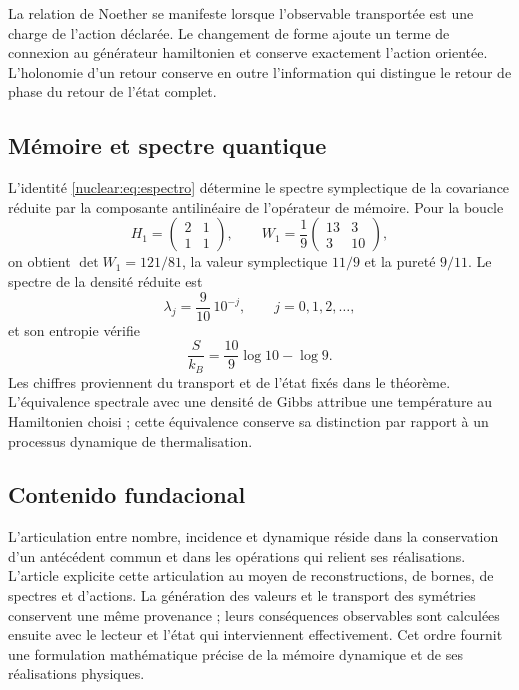 La relation de Noether se manifeste lorsque l’observable transportée est une charge de l’action déclarée. Le changement de forme ajoute un terme de connexion au générateur hamiltonien et conserve exactement l’action orientée. L’holonomie d’un retour conserve en outre l’information qui distingue le retour de phase du retour de l’état complet.


\subsection{Mémoire et spectre quantique}
L’identité \eqref{nuclear:eq:espectro} détermine le spectre symplectique de la covariance réduite par la composante antilinéaire de l’opérateur de mémoire. Pour la boucle
\[
H_1=\begin{pmatrix}2&1\\1&1\end{pmatrix},
\qquad
W_1=\frac19\begin{pmatrix}13&3\\3&10\end{pmatrix},
\]
on obtient \(\det W_1=121/81\), la valeur symplectique \(11/9\) et la pureté \(9/11\). Le spectre de la densité réduite est
\[
\lambda_j=\frac9{10}\,10^{-j},\qquad j=0,1,2,\ldots,
\]
et son entropie vérifie
\[
\frac{S}{k_B}=\frac{10}{9}\log10-\log9.
\]
Les chiffres proviennent du transport et de l’état fixés dans le théorème. L’équivalence spectrale avec une densité de Gibbs attribue une température au Hamiltonien choisi ; cette équivalence conserve sa distinction par rapport à un processus dynamique de thermalisation.

\subsection{Contenido fundacional}
L’articulation entre nombre, incidence et dynamique réside dans la conservation d’un antécédent commun et dans les opérations qui relient ses réalisations. L’article explicite cette articulation au moyen de reconstructions, de bornes, de spectres et d’actions. La génération des valeurs et le transport des symétries conservent une même provenance ; leurs conséquences observables sont calculées ensuite avec le lecteur et l’état qui interviennent effectivement. Cet ordre fournit une formulation mathématique précise de la mémoire dynamique et de ses réalisations physiques.

